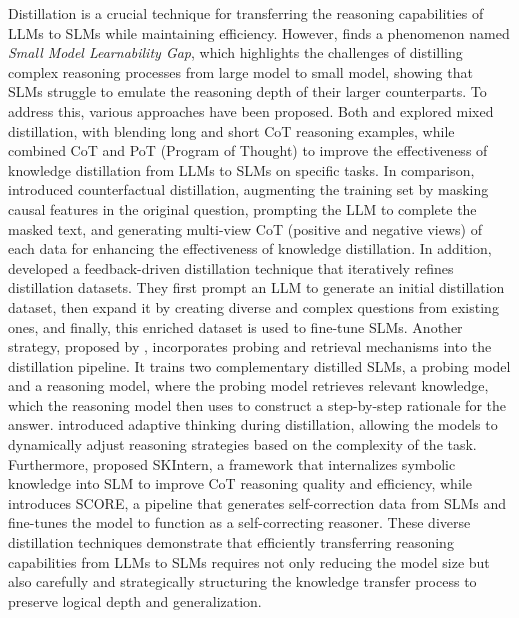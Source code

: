Distillation is a crucial technique for transferring the reasoning capabilities of LLMs to SLMs while maintaining efficiency. However, \cite{li2025small} finds a phenomenon named \textit{Small Model Learnability Gap}, which highlights the challenges of distilling complex reasoning processes from large model to small model, showing that SLMs struggle to emulate the reasoning depth of their larger counterparts. To address this, various approaches have been proposed. Both \cite{li2025small} and \cite{chenglin2024mixed} explored mixed distillation, with \cite{li2025small} blending long and short CoT reasoning examples, while \cite{chenglin2024mixed} combined CoT and PoT (Program of Thought) to improve the effectiveness of knowledge distillation from LLMs to SLMs on specific tasks. In comparison, \cite{feng2024teaching} introduced counterfactual distillation, augmenting the training set by masking causal features in the original question, prompting the LLM to complete the masked text, and generating multi-view CoT (positive and negative views) of each data for enhancing the effectiveness of knowledge distillation. 
%
In addition, \cite{zhu2024improving} developed a feedback-driven distillation technique that iteratively refines distillation datasets. They first prompt an LLM to generate an initial distillation dataset, then expand it by creating diverse and complex questions from existing ones, and finally, this enriched dataset is used to fine-tune SLMs. Another strategy, proposed by \cite{zhao2024probe}, incorporates probing and retrieval mechanisms into the distillation pipeline. It trains two complementary distilled SLMs, a probing model and a reasoning model, where the probing model retrieves relevant knowledge, which the reasoning model then uses to construct a step-by-step rationale for the answer. \cite{chen2024distilling} introduced adaptive thinking during distillation, allowing the models to dynamically adjust reasoning strategies based on the complexity of the task. 
%
Furthermore, \cite{liao2025skintern} proposed SKIntern, a framework that internalizes symbolic knowledge into SLM to improve CoT reasoning quality and efficiency, while \cite{zhang2024small} introduces SCORE, a pipeline that generates self-correction data from SLMs and fine-tunes the model to function as a self-correcting reasoner. These diverse distillation techniques demonstrate that efficiently transferring reasoning capabilities from LLMs to SLMs requires not only reducing the model size but also carefully and strategically structuring the knowledge transfer process to preserve logical depth and generalization.


